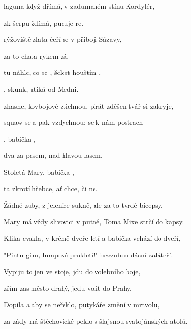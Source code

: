 

\zs
{} laguna když dřímá, v zadumaném stínu Kordylér, 

 zk šerpu ždímá,  pucuje re. 

\bigskip

 rýžoviště zlata čeří se v příboji Sázavy, 

 za to  chata  rykem  zá. 

\bigskip

 tu náhle, co se ,  šelest houštím , 

, skunk,  utíká   od Medni. 

\bigskip

 zhasne, kovbojové ztichnou, pirát zděšen tvář si zakryje, 

 squaw se  a pak vzdychnou:  se k nám postrach  
\ks

\zr
{}, babička , 

dva  za pasem, nad hlavou  lasem. 

Stoletá Mary, babička , 

ta zkrotí  hřebce, ať chce, či ne. 
\kr

\zs
Žádné zuby, z jelenice sukně, ale za to tvrdé bicepsy, 

Mary má vždy slivovici v putně, Toma Mixe strčí do kapsy. 

\bigskip

Klika cvakla, v krčmě dveře letí a babička vchází do dveří, 

"Pintu ginu, lumpové prokletí!" bezzubou dásní zaláteří. 

\bigskip

Vypiju to jen ve stoje, jdu do volebního boje, 

zřím zas město drahý, jedu volit do Prahy. 

\bigskip

Dopila a aby se neřeklo, putykáře změní v mrtvolu, 

za zády má štěchovické peklo s šlajsnou svatojánských atolů. 
\ks

